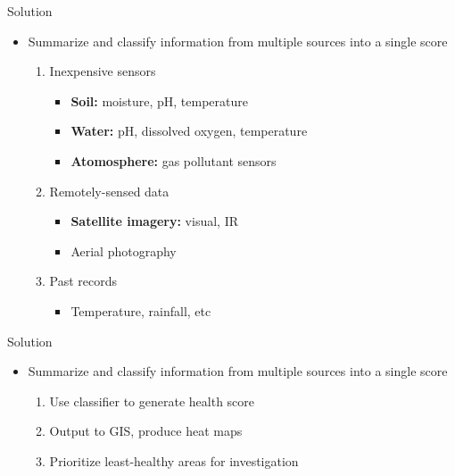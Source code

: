 \documentclass{beamer}
\begin{document}
\begin{frame}
    \huge{Solution}\normalsize
    \begin{itemize}
        \item<1->\large{Summarize and classify information from \alert{multiple sources} into a single score}\normalsize
        \begin{enumerate}
            \item<2-> \alert<2-5>{Inexpensive sensors}
            \begin{itemize}
                \item<3->\textbf{Soil:} moisture, pH, temperature
                \item<4->\textbf{Water:} pH, dissolved oxygen, temperature
                \item<5->\textbf{Atomosphere:} gas pollutant sensors
            \end{itemize}
            \item<6-> \alert<6-8>{Remotely-sensed data}
            \begin{itemize}
                \item<7->\textbf{Satellite imagery:} visual, IR
                \item<8->Aerial photography
            \end{itemize}
            \item<9->\alert<9-10>{Past records}
            \begin{itemize}
                \item<10-> Temperature, rainfall, etc
            \end{itemize}
        \end{enumerate}
    \end{itemize}
\end{frame}

\begin{frame}
    \huge{Solution}\normalsize
    \begin{itemize}
        \item<1->\large{Summarize and classify information from multiple sources into \alert{a single score}}\normalsize
        \begin{enumerate}
            \item<2-> Use classifier to generate health score
            \item<3-> Output to GIS, produce heat maps
            \item<4-> Prioritize least-healthy areas for investigation
        \end{enumerate}
    \end{itemize}
\end{frame}
\end{document}
